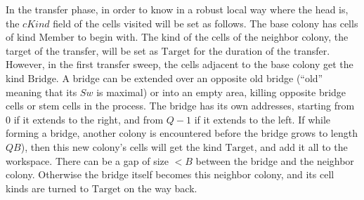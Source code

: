 \documentclass[12pt]{memoir}
\newcommand{\fld}[1]{\ensuremath{\textit{#1}}}
\newcommand{\rul}[1]{\ensuremath{\texttt{\slshape #1\/}}}
\def\B{B}
\newcommand{\cDrift}{\fld{cDrift}}
\newcommand{\NonAdj}{\fld{NonAdj}}
\newcommand{\Kind}{\fld{Kind}}
\newcommand{\cKind}{\fld{cKind}}
\newcommand{\Sweep}{\fld{Sw}}
\newcommand{\cSweep}{\fld{cSw}}
\newcommand{\Bridge}{\mathrm{Bridge}}
\newcommand{\Last}{\mathrm{Last}}
\newcommand{\Member}{\mathrm{Member}}
\newcommand{\Target}{\mathrm{Target}}
\newcommand{\Vacant}{\mathrm{Vac}}
\newcommand{\Alarm}{\rul{Alarm}}
\begin{document}
In the transfer phase, in order to know in a robust local way where the head is,
the \( \cKind \) field of the cells visited will be set as follows.
The base colony has cells of kind \( \Member \) to begin with.
The kind of the cells of the neighbor colony, the target of the transfer, will be set
as \( \Target \) for the duration of the transfer.
However, in the first transfer sweep, the cells adjacent to the base colony get the
kind \( \Bridge \).
A bridge can be extended over an opposite old bridge (``old'' meaning 
that its \( \Sweep \) is maximal) or 
into an empty area, killing opposite bridge cells or stem cells in the process.
The bridge has its own addresses, starting from 0 if it extends to the right,
and from \( Q-1 \) if it extends to the left.
If while forming a bridge, another colony is encountered before
the bridge grows to length \( Q\B \)), then this new colony's cells will get the 
kind \( \Target \), and add it all to the workspace.
There can be a gap of size \( <\B \) between the bridge and the neighbor colony.
Otherwise the bridge itself becomes this neighbor colony, and its cell kinds are
turned to \( \Target \) on the way back.





\end{document}
